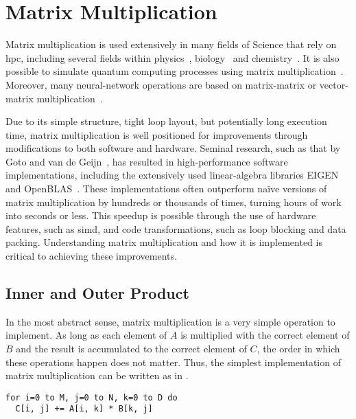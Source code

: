 \documentclass[\main/thesis.tex]{subfiles}
\begin{document}
\chapter{Matrix Multiplication}
\label{cha:matmul}
Matrix multiplication is used extensively in many fields of Science that rely on \gls{hpc}, including several fields within physics~\autocite{krol2014matrix}, biology~\autocite{akutsu2000algorithms} and chemistry~\autocite{weber2015semiempirical}.
It is also possible to simulate quantum computing processes using matrix multiplication~\autocite{zulehner2019matrix}.
Moreover, many neural-network operations are based on matrix-matrix or vector-matrix multiplication~\autocite{rojas1996neural,blue1992training}.

Due to its simple structure, tight loop layout, but potentially long execution time, matrix multiplication is well positioned for improvements through modifications to both software and hardware.
Seminal research, such as that by Goto and van de Geijn~\autocite{goto2008anatomy}, has resulted in high-performance software implementations, including the extensively used linear-algebra libraries EIGEN~\autocite{guennebaud2021eigen} and OpenBLAS~\autocite{xianyi2012model}.
These implementations often outperform na\"ive versions of matrix multiplication by hundreds or thousands of times, turning hours of work into seconds or less.
This speedup is possible through the use of hardware features, such as \gls{simd}, and code transformations, such as loop blocking and data packing.
Understanding matrix multiplication and how it is implemented is critical to achieving these improvements.

\section{Inner and Outer Product}
\label{sec:products}
In the most abstract sense, matrix multiplication is a very simple operation to implement.
As long as each element of $A$ is multiplied with the correct element of $B$ and the result is accumulated to the correct element of $C$, the order in which these operations happen does not matter.
Thus, the simplest implementation of matrix multiplication can be written as in .
\begin{lstlisting}[caption={[Pseudocode for Matrix Multiplication]Pseudocode implementing matrix multiplication as simply as possible.},label=lst:basicMatMul,columns=flexible]
for i=0 to M, j=0 to N, k=0 to D do
  C[i, j] += A[i, k] * B[k, j]
\end{lstlisting}
\end{document}
